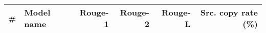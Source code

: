 \begin{table*}
\begin{center}
{\small
\begin{tabular}{|r|l|r|r|r|r|}
\hline
{\bf \#} &  {\bf Model name} & {\bf Rouge-1} & {\bf Rouge-2} & {\bf Rouge-L} & {\bf Src. copy rate (\%)}\\
\hline

\hline




\end{tabular}}
\end{center}
\end{table*}
